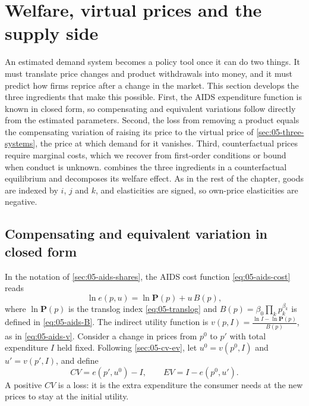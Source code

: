 \section{Welfare, virtual prices and the supply side}\label{sec:05-welfare}

An estimated demand system becomes a policy tool once it can do two things. It must translate price changes
and product withdrawals into money, and it must predict how firms reprice after a change in the market. This
section develops the three ingredients that make this possible. First, the AIDS expenditure function is known
in closed form, so compensating and equivalent variations follow directly from the estimated parameters.
Second, the loss from removing a product equals the compensating variation of raising its price to the
virtual price of \cref{sec:05-three-systems}, the price at which demand for it vanishes. Third, counterfactual prices require marginal
costs, which we recover from first-order conditions or bound when conduct is unknown. 
combines the three ingredients in a counterfactual equilibrium and decomposes its welfare effect. As in the
rest of the chapter, goods are indexed by $i$, $j$ and $k$, and elasticities are signed, so own-price
elasticities are negative.

\subsection{Compensating and equivalent variation in closed form}\label{sec:05-welfare-cv}

In the notation of \cref{sec:05-aids-shares}, the AIDS cost function \eqref{eq:05-aids-cost} reads
\begin{equation}\label{eq:05-welfare-cost}
  \ln e(p,u) = \ln \mathbf{P}(p) + u\, B(p),
\end{equation}
where $\ln\mathbf{P}(p)$ is the translog index \eqref{eq:05-translog} and $B(p) = \beta_0\prod_k p_k^{\beta_k}$
is defined in \eqref{eq:05-aids-B}. The indirect utility function is $v(p,I) = \frac{\ln I -
\ln\mathbf{P}(p)}{B(p)}$, as in \eqref{eq:05-aids-v}. Consider a change in prices from $p^0$ to $p'$ with
total expenditure $I$ held fixed. Following \cref{sec:05-cv-ev}, let $u^0 = v(p^0,I)$ and $u' = v(p',I)$, and define
\begin{equation*}
  CV = e(p',u^0) - I, \qquad EV = I - e(p^0,u').
\end{equation*}
A positive $CV$ is a loss: it is the extra expenditure the consumer needs at the new prices to stay at the
initial utility.

